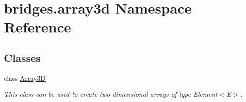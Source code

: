\hypertarget{namespacebridges_1_1array3d}{}\section{bridges.\+array3d Namespace Reference}
\label{namespacebridges_1_1array3d}
\subsection*{Classes}
\begin{DoxyCompactItemize}
\item 
class \hyperlink{classbridges_1_1array3d_1_1_array3_d}{Array3D}
\begin{DoxyCompactList}\small\item\em This class can be used to create two dimensional arrays of type Element$<$\+E$>$. \end{DoxyCompactList}\end{DoxyCompactItemize}
